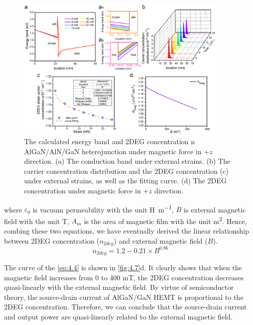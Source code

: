 \begin{figure}[H] 
\centering    
\includegraphics[width=0.9\textwidth]{ch4_7}
\caption[The calculated energy band and 2DEG concentration n AlGaN/AlN/GaN heterojunction under magnetic force in $+z$ direction.]{The calculated energy band and 2DEG concentration n AlGaN/AlN/GaN heterojunction under magnetic force in $+z$ direction. (a) The conduction band under external strains. (b) The carrier concentration distribution and the 2DEG concentration (c) under external strains, as well as the fitting curve. (d) The 2DEG concentration under magnetic force in $+z$ direction.}
\label{fig:4.7}
\end{figure}

\noindent where $\varepsilon_{0}$ is vacuum permeability with the unit \unit{\henry\per\m}, $B$ is external magnetic field with the unit \unit{\tesla}, $A_{m}$ is the area of magnetic film with the unit \unit{\square\m}. Hence, combing these two equations, we have eventually derived the linear relationship between 2DEG concentration  ($n_{2deg}$) and external magnetic field ($B$).
\begin{equation}
	n_{2deg}=1.2-0.21\times B^{0.86}
\label{eq:4.4}
\end{equation} 

The  curve of the \autoref{eq:4.4} is shown in \autoref{fig:4.7}d. It clearly shows that when the magnetic field  increases from 0 to 400 \unit{\milli\tesla}, the 2DEG  concentration decreases quasi-linearly with the external magnetic field. By virtue of semiconductor theory, the source-drain current of  AlGaN/GaN HEMT is proportional to the 2DEG concentration. Therefore, we can conclude that the source-drain current and  output power are quasi-linearly related to the external magnetic field.


